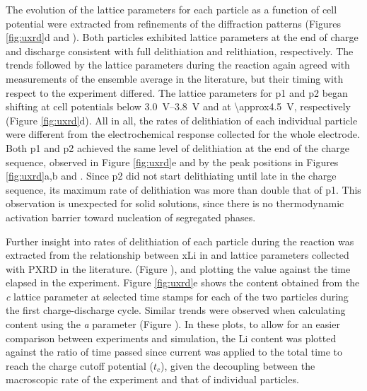 \documentclass{article}
\begin{document}
The evolution of the lattice parameters for each particle as a
function of cell potential were extracted from refinements of the
diffraction patterns (Figures \ref{fig:uxrd}d and
). Both particles exhibited lattice parameters
at the end of charge and discharge consistent with full delithiation
and relithiation, respectively\cite{novak2015}. The trends followed by
the lattice parameters during the reaction again agreed with
measurements of the ensemble average in the
literature\cite{novak2015, faenza2018}, but their timing with respect to the experiment differed. The lattice parameters for
\gls{p1} and \gls{p2} began shifting at cell potentials below
\SIrange{3.0}{3.8}{\volt} and at \SI{\approx4.5}{\volt}, respectively
(Figure \ref{fig:uxrd}d). All in all, the rates of delithiation of
each individual particle were different from the electrochemical
response collected for the whole electrode. Both \gls{p1} and \gls{p2}
achieved the same level of delithiation at the end of the charge
sequence, observed in Figure \ref{fig:uxrd}e and by the peak positions
in Figures \ref{fig:uxrd}a,b and . Since
\gls{p2} did not start delithiating until late in the charge sequence,
its maximum rate of delithiation was more than double that of
\gls{p1}. This observation is unexpected for solid solutions, since there is no thermodynamic activation barrier toward nucleation of segregated phases.


\newpage %
Further insight into rates of delithiation of each particle during the reaction was
extracted from the relationship between \gls{xLi} in  and
lattice parameters collected with PXRD in the literature.\cite{robert2015} (Figure
), and plotting the value against the time elapsed in the experiment. Figure \ref{fig:uxrd}e shows the 
content obtained from the \emph{c} lattice parameter at selected time stamps for each of the
two  particles during the first charge-discharge cycle. Similar trends
were observed when calculating  content using the \emph{a}
parameter (Figure ). In these plots, to allow for
an easier comparison between experiments and simulation, the Li
content was plotted against the ratio of time passed since current was
applied to the total time to reach the charge cutoff potential ($t_c$), given the decoupling between the macroscopic rate of the experiment and that of individual particles.
\end{document}
